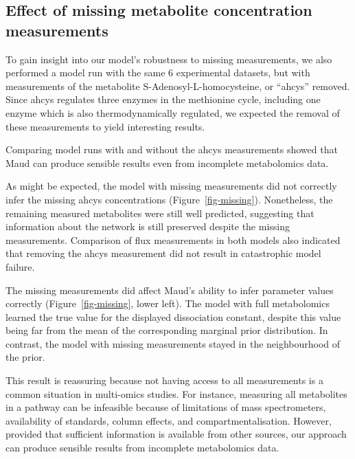 \documentclass[journal=asbcd6,manuscript=article,layout=traditional]{achemso}
\begin{document}
\subsection{Effect of missing metabolite concentration
measurements}\label{effect-of-missing-metabolite-concentration-measurements}

To gain insight into our model's robustness to missing measurements, we
also performed a model run with the same 6 experimental datasets, but
with measurements of the metabolite S-Adenosyl-L-homocysteine, or
``ahcys'' removed. Since ahcys regulates three enzymes in the methionine
cycle, including one enzyme which is also thermodynamically regulated,
we expected the removal of these measurements to yield interesting
results.

Comparing model runs with and without the ahcys measurements showed that
Maud can produce sensible results even from incomplete metabolomics
data.

As might be expected, the model with missing measurements did not
correctly infer the missing ahcys concentrations
(Figure~\ref{fig-missing}). Nonetheless, the remaining measured
metabolites were still well predicted, suggesting that information about
the network is still preserved despite the missing measurements.
Comparison of flux measurements in both models also indicated that
removing the ahcys measurement did not result in catastrophic model
failure.

The missing measurements did affect Maud's ability to infer parameter
values correctly (Figure~\ref{fig-missing}, lower left). The model with
full metabolomics learned the true value for the displayed dissociation
constant, despite this value being far from the mean of the
corresponding marginal prior distribution. In contrast, the model with
missing measurements stayed in the neighbourhood of the prior.

This result is reassuring because not having access to all measurements
is a common situation in multi-omics studies. For instance, measuring
all metabolites in a pathway can be infeasible because of limitations of
mass spectrometers, availability of standards, column effects, and
compartmentalisation. However, provided that sufficient information is
available from other sources, our approach can produce sensible results
from incomplete metabolomics data.
\end{document}
